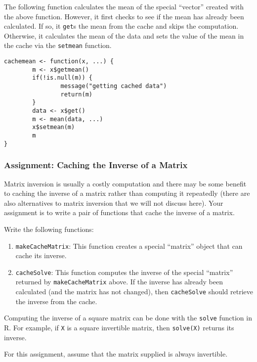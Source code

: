 \documentclass[]{article}
\begin{document}
The following function calculates the mean of the special ``vector''
created with the above function. However, it first checks to see if the
mean has already been calculated. If so, it \texttt{get}s the mean from
the cache and skips the computation. Otherwise, it calculates the mean
of the data and sets the value of the mean in the cache via the
\texttt{setmean} function.

\begin{verbatim}
cachemean <- function(x, ...) {
        m <- x$getmean()
        if(!is.null(m)) {
                message("getting cached data")
                return(m)
        }
        data <- x$get()
        m <- mean(data, ...)
        x$setmean(m)
        m
}
\end{verbatim}

\subsubsection{Assignment: Caching the Inverse of a
Matrix}\label{assignment-caching-the-inverse-of-a-matrix}

Matrix inversion is usually a costly computation and there may be some
benefit to caching the inverse of a matrix rather than computing it
repeatedly (there are also alternatives to matrix inversion that we will
not discuss here). Your assignment is to write a pair of functions that
cache the inverse of a matrix.

Write the following functions:

\begin{enumerate}
\def\labelenumi{\arabic{enumi}.}
\itemsep1pt\parskip0pt
\item
  \texttt{makeCacheMatrix}: This function creates a special ``matrix''
  object that can cache its inverse.
\item
  \texttt{cacheSolve}: This function computes the inverse of the special
  ``matrix'' returned by \texttt{makeCacheMatrix} above. If the inverse
  has already been calculated (and the matrix has not changed), then
  \texttt{cacheSolve} should retrieve the inverse from the cache.
\end{enumerate}

Computing the inverse of a square matrix can be done with the
\texttt{solve} function in R. For example, if \texttt{X} is a square
invertible matrix, then \texttt{solve(X)} returns its inverse.

For this assignment, assume that the matrix supplied is always
invertible.
\end{document}
